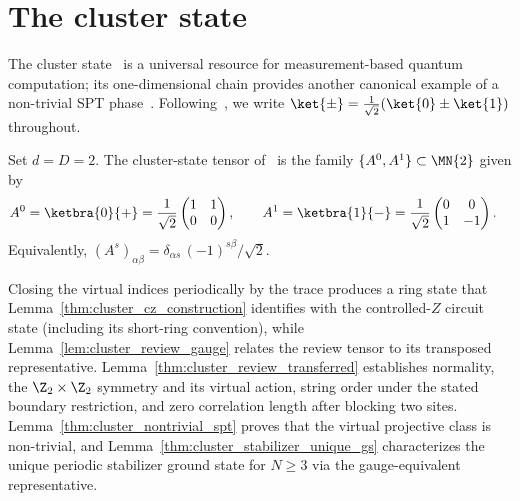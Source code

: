 \section{The cluster state}\label{sec:cluster}

The cluster state~\cite{BriegelRaussendorf2001,RaussendorfBriegel2001} is a
universal resource for measurement-based quantum computation; its
one-dimensional chain provides another canonical example of a
non-trivial SPT phase~\cite{Schuch2011Phases,Cirac2021Matrix}. Following~\cite[Appendix~A, ``The cluster state'']{Cirac2021Matrix}, we write
$\ket{\pm} = \tfrac{1}{\sqrt{2}}(\ket{0} \pm \ket{1})$ throughout.

\begin{definition}\label{def:cluster_tensor_review}
    \leanok
    Set $d = D = 2$. The cluster-state tensor
    of~\cite[Appendix~A, ``The cluster state'']{Cirac2021Matrix} is the family
    $\{A^0, A^1\} \subset \MN{2}$ given by
    \begin{align}
        A^0
         & = \ketbra{0}{+}
        = \frac{1}{\sqrt{2}}
        \begin{pmatrix} 1 & 1 \\ 0 & 0 \end{pmatrix},
        \qquad
        A^1
        = \ketbra{1}{-}
        = \frac{1}{\sqrt{2}}
        \begin{pmatrix} 0 & 0 \\ 1 & -1 \end{pmatrix}.
        \notag
    \end{align}
    Equivalently, $(A^s)_{\alpha\beta} = \delta_{\alpha s}\,(-1)^{s\beta}/\sqrt{2}$.
\end{definition}

Closing the virtual indices periodically by the trace produces a ring state
that Lemma~\ref{thm:cluster_cz_construction} identifies with the
controlled-$Z$ circuit state (including its short-ring convention), while
Lemma~\ref{lem:cluster_review_gauge} relates the review tensor to its
transposed representative.
Lemma~\ref{thm:cluster_review_transferred} establishes normality, the
$\Z_2\times\Z_2$ symmetry and its virtual action, string order under the
stated boundary restriction, and zero correlation length after blocking
two sites. Lemma~\ref{thm:cluster_nontrivial_spt} proves that the virtual
projective class is non-trivial, and
Lemma~\ref{thm:cluster_stabilizer_unique_gs} characterizes the unique
periodic stabilizer ground state for $N\ge3$ via the gauge-equivalent
representative.



